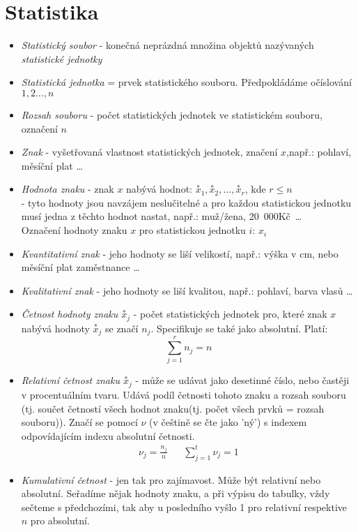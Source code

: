 \documentclass[12pt]{article}
\begin{document}
\section{Statistika}
\begin{itemize}
\item \emph{Statistický soubor} - konečná neprázdná množina objektů nazývaných \emph{statistické jednotky}
\item \emph{Statistická jednotka} = prvek statistického souboru. Předpokládáme očíslování $1,2 \dotsc, n $
\item \emph{Rozsah souboru} - počet statistických jednotek ve statistickém souboru, označení $n$
\item \emph{Znak} - vyšetřovaná vlastnost statistických jednotek, značení $x$,např.: pohlaví, měsíční plat \dots
\item \emph{Hodnota znaku} - znak $x$ nabývá hodnot: $\overset{*}{x}_1,\overset{*}{x}_2, \dots , \overset{*}{x}_r$, kde $r \leq n$\\
 - tyto hodnoty jsou navzájem neslučitelné a pro každou statistickou jednotku musí jedna z těchto hodnot  nastat, např.: muž/žena, 20~000Kč~\dots \\Označení hodnoty znaku $x$ pro statistickou jednotku $i$: $x_i$
 \item \emph{Kvantitativní znak} - jeho hodnoty se liší velikostí, např.: výška v cm, nebo měsíční plat zaměstnance \dots 
 \item \emph{Kvalitativní znak} - jeho hodnoty se liší kvalitou, např.: pohlaví, barva vlasů \dots
 \item \emph{Četnost hodnoty znaku $\overset{*}{x}_j$} - počet statistických jednotek pro, které znak $x$ nabývá hodnoty $\overset{*}{x}_j$ se značí $n_j$. Specifikuje se také jako absolutní. Platí:
 \begin{equation}
 \sum^r_{j=1} n_j = n
\end{equation}
 \item \emph{Relativní četnost znaku $\overset{*}{x}_j$} - může se udávat jako desetinné číslo, nebo častěji v procentuálním tvaru. Udává podíl četnosti tohoto znaku a rozsah souboru (tj. součet četností všech hodnot znaku(tj. počet všech prvků = rozsah souboru)). Značí se pomocí $\nu$ (v češtině se čte jako 'ný') s indexem odpovídajícím indexu absolutní četnosti.
 \begin{align}
 \nu_j = \frac{n_j}{n} && \sum^t_{j=1} \nu_j = 1
 \end{align}
\item \emph{Kumulativní četnost} - jen tak pro zajímavost. Může být relativní nebo absolutní. Seřadíme nějak hodnoty znaku, a při výpisu do tabulky, vždy sečteme s předchozími, tak aby u posledního vyšlo 1 pro relativní respektive $n$ pro absolutní.
\end{itemize}
\end{document}
